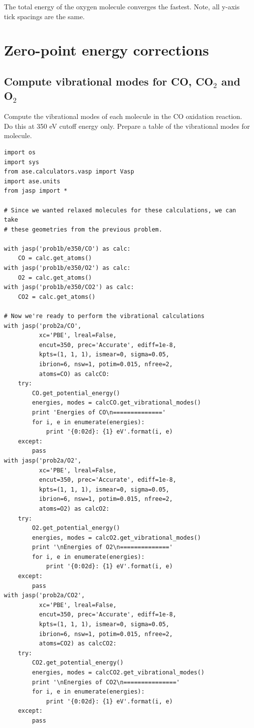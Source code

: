 \documentclass[11pt]{article}
\begin{document}
The total energy of the oxygen molecule converges the fastest. Note, all y-axis tick spacings are the same.
\section{Zero-point energy corrections}
\label{sec-2}
\subsection{Compute vibrational modes for CO, CO$_{2}$ and O$_{2}$}
\label{sec-2-1}

Compute the vibrational modes of each molecule in the CO oxidation reaction. Do this at 350 eV cutoff energy only. Prepare a table of the vibrational modes for molecule.


\begin{verbatim}
import os
import sys
from ase.calculators.vasp import Vasp
import ase.units
from jasp import *

# Since we wanted relaxed molecules for these calculations, we can take
# these geometries from the previous problem.

with jasp('prob1b/e350/CO') as calc:
    CO = calc.get_atoms()
with jasp('prob1b/e350/O2') as calc:
    O2 = calc.get_atoms()
with jasp('prob1b/e350/CO2') as calc:
    CO2 = calc.get_atoms()

# Now we're ready to perform the vibrational calculations
with jasp('prob2a/CO',
          xc='PBE', lreal=False,
          encut=350, prec='Accurate', ediff=1e-8,
          kpts=(1, 1, 1), ismear=0, sigma=0.05,
          ibrion=6, nsw=1, potim=0.015, nfree=2,
          atoms=CO) as calcCO:
    try:
        CO.get_potential_energy()
        energies, modes = calcCO.get_vibrational_modes()
        print 'Energies of CO\n=============='
        for i, e in enumerate(energies):
            print '{0:02d}: {1} eV'.format(i, e)
    except:
        pass
with jasp('prob2a/O2',
          xc='PBE', lreal=False,
          encut=350, prec='Accurate', ediff=1e-8,
          kpts=(1, 1, 1), ismear=0, sigma=0.05,
          ibrion=6, nsw=1, potim=0.015, nfree=2,
          atoms=O2) as calcO2:
    try:
        O2.get_potential_energy()
        energies, modes = calcO2.get_vibrational_modes()
        print '\nEnergies of O2\n=============='
        for i, e in enumerate(energies):
            print '{0:02d}: {1} eV'.format(i, e)
    except:
        pass
with jasp('prob2a/CO2',
          xc='PBE', lreal=False,
          encut=350, prec='Accurate', ediff=1e-8,
          kpts=(1, 1, 1), ismear=0, sigma=0.05,
          ibrion=6, nsw=1, potim=0.015, nfree=2,
          atoms=CO2) as calcCO2:
    try:
        CO2.get_potential_energy()
        energies, modes = calcCO2.get_vibrational_modes()
        print '\nEnergies of CO2\n==============='
        for i, e in enumerate(energies):
            print '{0:02d}: {1} eV'.format(i, e)
    except:
        pass
\end{verbatim}
\end{document}
